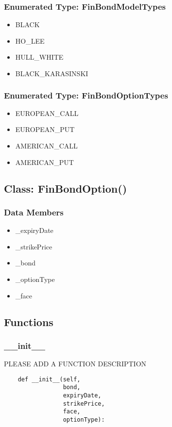 \documentclass[twoside,11pt]{book}
\begin{document}
\subsubsection{Enumerated Type: FinBondModelTypes}
\begin{itemize}
\item{BLACK}
\item{HO\_LEE}
\item{HULL\_WHITE}
\item{BLACK\_KARASINSKI}
\end{itemize}

\subsubsection{Enumerated Type: FinBondOptionTypes}
\begin{itemize}
\item{EUROPEAN\_CALL}
\item{EUROPEAN\_PUT}
\item{AMERICAN\_CALL}
\item{AMERICAN\_PUT}
\end{itemize}

\subsection*{Class: FinBondOption()}


\subsubsection*{Data Members}
\begin{itemize}
\item{\_expiryDate}
\item{\_strikePrice}
\item{\_bond}
\item{\_optionType}
\item{\_face}
\end{itemize}

\subsection*{Functions}

\subsubsection*{{\bf \_\_init\_\_}}
PLEASE ADD A FUNCTION DESCRIPTION

\begin{lstlisting}
    def __init__(self,
                 bond,
                 expiryDate,
                 strikePrice,
                 face,
                 optionType):
\end{lstlisting}
\end{document}
